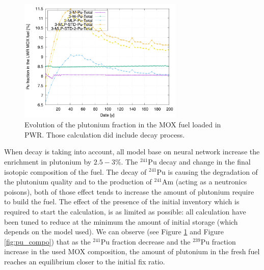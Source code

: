 \documentclass[12pt]{article}
\begin{document}
\begin{figure}[h!]
  \centering
  \includegraphics[width=0.7\textwidth]  {img/C_1_3_MOX_pu_contribution}
  \caption{Evolution of the plutonium fraction in the MOX fuel loaded in PWR.
  Those calculation did include decay process.}
  \label{fig:puflow_D}
\end{figure}
%  
%

When decay is taking into account, all model base on neural network increase the
enrichment in plutonium by $2.5-3\%$. The $^{241}$Pu decay and change in the
final isotopic composition of the fuel.  The decay of $^{241}$Pu is causing the
degradation of the plutonium quality and to the production of $^{241}$Am (acting
as a neutronics poisons), both of those effect tends to increase the amount of
plutonium require to build the fuel.
The effect of the presence of the initial inventory which is required to start
the calculation, is as limited as possible: all calculation have been tuned to
reduce at the minimum the amount of initial storage (which depends on the model
used).
We can observe (see Figure \ref{fig:puflow_D} and Figure \ref{fig:pu_compo})
that as the $^{241}$Pu fraction decrease and the $^{239}$Pu fraction increase in
the used MOX composition, the amount of plutonium in the fresh fuel reaches an
equilibrium closer to the initial fix ratio.
\end{document}
